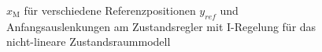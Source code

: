 \begin{figure}[H]
    \centering
    \caption[$x_{\mathrm{M}}$ für Regler mit I-Regelung (nicht-linear)]{$x_{\mathrm{M}}$ für verschiedene Referenzpositionen $y_{ref}$ und Anfangsauslenkungen am Zustandsregler mit I-Regelung für das nicht-lineare Zustandsraummodell}
    \label{fig:Bild38}
\end{figure}

